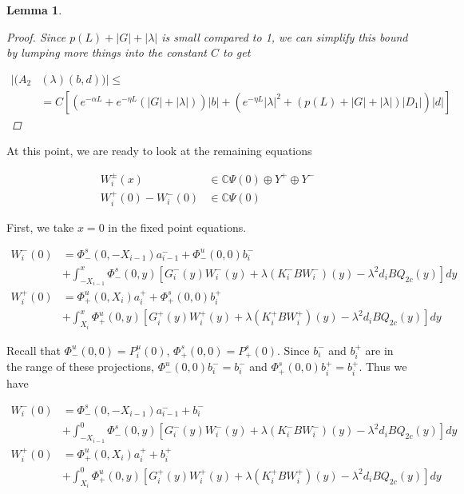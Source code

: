 \documentclass[12pt]{article}
\def\C{{\mathbb C}}
\newtheorem{lemma}{Lemma}
\begin{document}
\begin{lemma}
\begin{proof}
Since $p(L) + |G| + |\lambda|$ is small compared to 1, we can simplify this bound by lumping more things into the constant $C$ to get

\begin{align*}
|(A_2&(\lambda)(b,d))| \leq \\
&= C \left[ \left( e^{-\alpha L} + e^{-\eta L} \left(|G| + |\lambda|\right)\right) |b|
+ \left( e^{-\eta L} |\lambda|^2 + \left( p(L) + |G| + |\lambda| \right)|D_1| \right)|d| \right]
\end{align*}

\end{proof}
\end{lemma}

At this point, we are ready to look at the remaining equations

\begin{align*}
W_i^\pm(x) &\in \C \Psi(0) \oplus Y^+ \oplus Y^- \\
W_i^+(0) - W_i^-(0) &\in \C \Psi(0) 
\end{align*}

First, we take $x = 0$ in the fixed point equations.

\begin{align*}
W_i^-(0) &= \Phi^s_-(0, -X_{i-1})a^-_{i-1} + \Phi^u_-(0, 0)b_i^- \\
&+ \int_{-X_{i-1}}^x \Phi^s_-(0, y)[G_i^-(y) W_i^-(y) + \lambda (K_i^-B W_i^-)(y) - \lambda^2 d_i B Q_{2c}(y) ] dy \\
W_i^+(0) &= \Phi^u_+(0, X_i)a^+_{i} + \Phi^s_+(0, 0)b_i^+ \\
&+ \int_{X_{i}}^x \Phi^u_+(0, y)[G_i^+(y) W_i^+(y) + \lambda (K_i^+ B W_i^+)(y) - \lambda^2 d_i B Q_{2c}(y) ] dy
\end{align*}

Recall that $\Phi^u_-(0, 0) = P^u_i(0)$, $\Phi^s_+(0, 0) = P^s_+(0)$. Since $b_i^-$ and $b_i^+$ are in the range of these projections, $\Phi^u_-(0, 0)b_i^- = b_i^-$ and $\Phi^s_+(0, 0)b_i^+ = b_i^+ $. Thus we have

\begin{align*}
W_i^-(0) &= \Phi^s_-(0, -X_{i-1})a^-_{i-1} + b_i^- \\
&+ \int_{-X_{i-1}}^0 \Phi^s_-(0, y)[G_i^-(y) W_i^-(y) + \lambda (K_i^-B W_i^-)(y) - \lambda^2 d_i B Q_{2c}(y) ] dy \\
W_i^+(0) &= \Phi^u_+(0, X_i)a^+_{i} + b_i^+ \\
&+ \int_{X_{i}}^0 \Phi^u_+(0, y)[G_i^+(y) W_i^+(y) + \lambda (K_i^+ B W_i^+)(y) - \lambda^2 d_i B Q_{2c}(y) ] dy
\end{align*}
\end{document}
